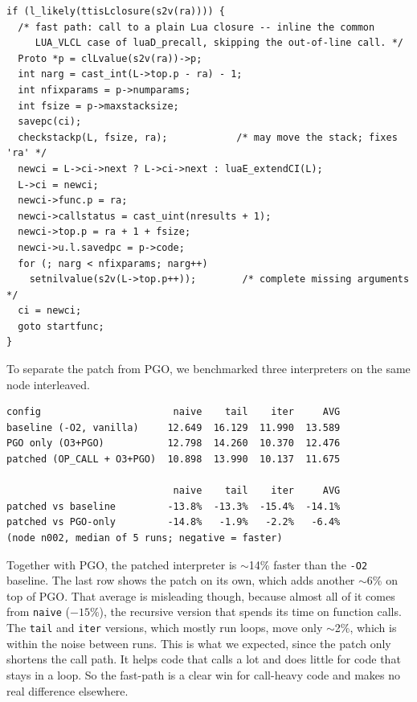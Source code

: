 \documentclass[a4paper]{article}
\begin{document}
\begin{verbatim}
if (l_likely(ttisLclosure(s2v(ra)))) {
  /* fast path: call to a plain Lua closure -- inline the common
     LUA_VLCL case of luaD_precall, skipping the out-of-line call. */
  Proto *p = clLvalue(s2v(ra))->p;
  int narg = cast_int(L->top.p - ra) - 1;
  int nfixparams = p->numparams;
  int fsize = p->maxstacksize;
  savepc(ci);
  checkstackp(L, fsize, ra);            /* may move the stack; fixes 'ra' */
  newci = L->ci->next ? L->ci->next : luaE_extendCI(L);
  L->ci = newci;
  newci->func.p = ra;
  newci->callstatus = cast_uint(nresults + 1);
  newci->top.p = ra + 1 + fsize;
  newci->u.l.savedpc = p->code;
  for (; narg < nfixparams; narg++)
    setnilvalue(s2v(L->top.p++));        /* complete missing arguments */
  ci = newci;
  goto startfunc;
}
\end{verbatim}

To separate the patch from PGO, we benchmarked three interpreters on the same node interleaved. 

\begin{verbatim}
config                       naive    tail    iter     AVG
baseline (-O2, vanilla)     12.649  16.129  11.990  13.589
PGO only (O3+PGO)           12.798  14.260  10.370  12.476
patched (OP_CALL + O3+PGO)  10.898  13.990  10.137  11.675

                             naive    tail    iter     AVG
patched vs baseline         -13.8%  -13.3%  -15.4%  -14.1%
patched vs PGO-only         -14.8%   -1.9%   -2.2%   -6.4%
(node n002, median of 5 runs; negative = faster)
\end{verbatim}

Together with PGO, the patched interpreter is $\sim$14\% faster than the \texttt{-O2} baseline. The last row shows the patch on its own, which adds another $\sim$6\% on top of PGO. That average is misleading though, because almost all of it comes from \texttt{naive} ($-15\%$), the recursive version that spends its time on function calls. The \texttt{tail} and \texttt{iter} versions, which mostly run loops, move only $\sim$2\%, which is within the noise between runs. This is what we expected, since the patch only shortens the call path. It helps code that calls a lot and does little for code that stays in a loop. So the fast-path is a clear win for call-heavy code and makes no real difference elsewhere.
\end{document}
